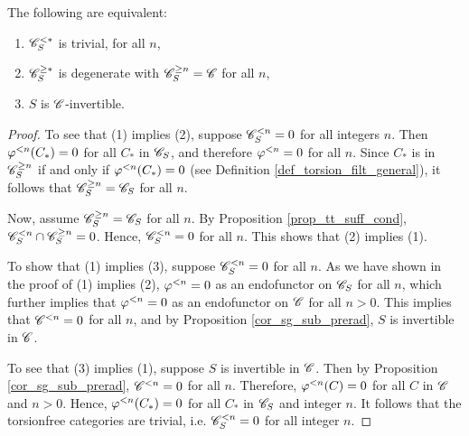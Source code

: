 \begin{prop}
The following are equivalent:

\begin{enumerate}

\item $\Corad{*}{\CatLoc{C}{S}}$ is trivial,
for all $n$,

\item $\Prerad{*}{\CatLoc{C}{S}}$ is degenerate with 
$\Prerad{n}{\CatLoc{C}{S}} = \Cat{C}$ for all $n$,

\item $S$ is $\Cat{C}$-invertible.
\end{enumerate}
\end{prop}
\begin{proof}
To see that (1) implies (2), suppose $\Corad{n}{\CatLoc{C}{S}} = 
0$ for all integers $n$. Then $\corad{n}(C_*) = 0$ for all $C_*$
in $\CatLoc{C}{S}$, and therefore $\corad{n} = 0$ for all $n$.
Since $C_*$ is in $\Prerad{n}{\CatLoc{C}{S}}$ if and only if
$\corad{n}(C_*) = 0$ (see Definition 
\ref{def_torsion_filt_general}), it follows that $\Prerad{n}{\CatLoc{C}{S}}
= \CatLoc{C}{S}$ for all $n$.

Now, assume $\Prerad{n}{\CatLoc{C}{S}} = \CatLoc{C}{S}$ for
all $n$. By Proposition \ref{prop_tt_suff_cond}, $\Corad{n}{\CatLoc{C}{S}}
\cap \Prerad{n}{\CatLoc{C}{S}} = 0$. Hence, $\Corad{n}{\CatLoc{C}{S}} = 0$
for all $n$. This shows that (2) implies (1).

To show that (1) implies (3), suppose $\Corad{n}{\CatLoc{C}{S}} = 0$
for all $n$. As we have shown in the proof of (1) implies (2), 
$\corad{n} = 0$ as an endofunctor on $\CatLoc{C}{S}$ for all $n$, 
which further implies that $\corad{n} = 0$ as an endofunctor on
$\Cat{C}$ for all $n > 0$. This implies that $\Corad{n}{\Cat{C}} = 0$
for all $n$, and by Proposition \ref{cor_sg_sub_prerad}, $S$ is
invertible in $\Cat{C}$.

To see that (3) implies (1), suppose $S$ is invertible in
$\Cat{C}$. Then by Proposition \ref{cor_sg_sub_prerad},
$\Corad{n}{\Cat{C}} = 0$ for all $n$. Therefore, $\corad{n}(C) = 0$
for all $C$ in $\Cat{C}$ and $n > 0$. Hence, $\corad{n}(C_*) = 0$
for all $C_*$ in $\CatLoc{C}{S}$ and integer $n$. It follows that
the torsionfree categories are trivial, i.e. 
$\Corad{n}{\CatLoc{C}{S}} = 0$ for all integer $n$.
\end{proof}

%
